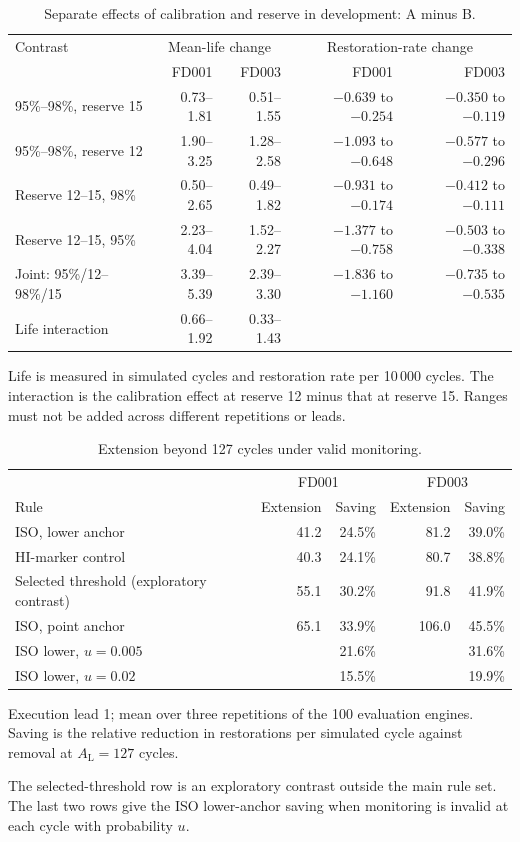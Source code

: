 \documentclass[12pt]{article}
\newcommand{\tablenotes}[1]{\par\smallskip\begin{minipage}{\linewidth}\footnotesize\raggedright\setlength{\parindent}{0pt}#1\end{minipage}}
\begin{document}
\begin{table}[htbp]
\centering
\caption{Separate effects of calibration and reserve in development: A minus B.}
\label{tab:calibration-reserve}
\footnotesize
\setlength{\tabcolsep}{3pt}
\begin{tabularx}{\linewidth}{@{}Xrrrr@{}}
\toprule
Contrast & \multicolumn{2}{c}{Mean-life change} & \multicolumn{2}{c}{Restoration-rate change} \\
 & FD001 & FD003 & FD001 & FD003 \\
\midrule
95\%--98\%, reserve 15 & 0.73--1.81 & 0.51--1.55 & $-0.639$ to $-0.254$ & $-0.350$ to $-0.119$ \\
95\%--98\%, reserve 12 & 1.90--3.25 & 1.28--2.58 & $-1.093$ to $-0.648$ & $-0.577$ to $-0.296$ \\
Reserve 12--15, 98\% & 0.50--2.65 & 0.49--1.82 & $-0.931$ to $-0.174$ & $-0.412$ to $-0.111$ \\
Reserve 12--15, 95\% & 2.23--4.04 & 1.52--2.27 & $-1.377$ to $-0.758$ & $-0.503$ to $-0.338$ \\
Joint: 95\%/12--98\%/15 & 3.39--5.39 & 2.39--3.30 & $-1.836$ to $-1.160$ & $-0.735$ to $-0.535$ \\
Life interaction & 0.66--1.92 & 0.33--1.43 & & \\
\bottomrule
\end{tabularx}
\tablenotes{Life is measured in simulated cycles and restoration rate per 10\,000 cycles.
The interaction is the calibration effect at reserve 12 minus that at reserve 15.
Ranges must not be added across different repetitions or leads.}
\end{table}

\begin{table}[htbp]
\centering
\caption{Extension beyond 127 cycles under valid monitoring.}
\label{tab:extension}
\footnotesize
\setlength{\tabcolsep}{3pt}
\begin{tabularx}{\linewidth}{@{}Xrrrr@{}}
\toprule
 & \multicolumn{2}{c}{FD001} & \multicolumn{2}{c}{FD003} \\
Rule & Extension & Saving & Extension & Saving \\
\midrule
ISO, lower anchor & 41.2 & 24.5\% & 81.2 & 39.0\% \\
HI-marker control & 40.3 & 24.1\% & 80.7 & 38.8\% \\
Selected threshold (exploratory contrast) & 55.1 & 30.2\% & 91.8 & 41.9\% \\
ISO, point anchor & 65.1 & 33.9\% & 106.0 & 45.5\% \\
\midrule
ISO lower, $u=0.005$ & & 21.6\% & & 31.6\% \\
ISO lower, $u=0.02$ & & 15.5\% & & 19.9\% \\
\bottomrule
\end{tabularx}
\tablenotes{Execution lead 1; mean over three repetitions of the 100 evaluation engines. Saving is the relative reduction in restorations per simulated cycle against removal at $A_{\mathrm L}=127$ cycles.

The selected-threshold row is an exploratory contrast outside the main rule set. The last two rows give the ISO lower-anchor saving when monitoring is invalid at each cycle with probability $u$.}
\end{table}
\end{document}
